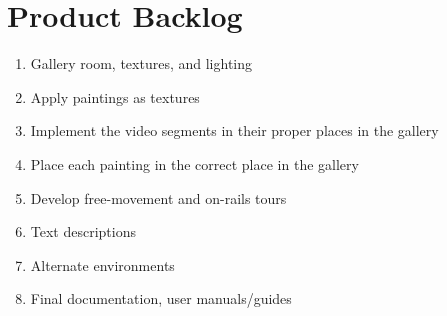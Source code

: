 \section{Product Backlog}
\begin{enumerate}
	\item Gallery room, textures, and lighting
	\item Apply paintings as textures
	\item Implement the video segments in their proper places in the gallery
	\item Place each painting in the correct place in the gallery
	\item Develop free-movement and on-rails tours
	\item Text descriptions
	\item Alternate environments
	\item Final documentation, user manuals/guides
\end{enumerate}
 

